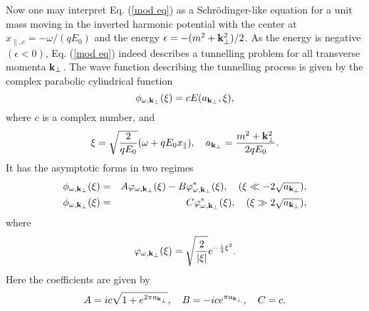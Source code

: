 \documentclass[a4paper,prd,showpacs,preprintnumbers,amsmath,amssymb]{revtex4}
\begin{document}
Now one may interpret Eq. (\ref{mod eq}) as a Schr\"{o}dinger-like
equation for a unit mass moving in the inverted harmonic potential
with the center at $x_{\parallel, c} = - \omega/(qE_0)$ and the
energy $\epsilon = - (m^2 + {\bf k}_{\perp}^2)/2$. As the energy
is negative $(\epsilon < 0)$, Eq. (\ref{mod eq}) indeed describes
a tunnelling problem for all transverse momenta ${\bf k}_{\perp}$.
The wave function describing the tunnelling process is given by
the complex parabolic cylindrical function \cite{abr}
\begin{equation}
\phi_{\omega, {\bf k}_{\perp}} (\xi) = c E(a_{{\bf k}_{\perp}},
\xi),
\end{equation}
where $c$ is a complex number, and
\begin{equation}
\xi = \sqrt{\frac{2}{q E_0}} ( \omega + q E_0 x_{\parallel}),
\quad a_{{\bf k}_{\perp}} = \frac{m^2 + {\bf k}_{\perp}^2}{2 q
E_0}.
\end{equation}
It has the asymptotic forms in two regimes
\begin{eqnarray}
\phi_{\omega, {\bf k}_{\perp}} (\xi) &=& A \varphi_{\omega, {\bf
k}_{\perp}} (\xi) - B \varphi^*_{\omega, {\bf k}_{\perp}} (\xi),
\quad (\xi  \ll -2 \sqrt{a_{{\bf k}_{\perp}}}),
 \nonumber\\
\phi_{\omega, {\bf k}_{\perp}} (\xi) &=& C \varphi^*_{\omega, {\bf
k}_{\perp}} (\xi), \quad (\xi  \gg 2 \sqrt{a_{{\bf k}_{\perp}}}),
\label{asym}
\end{eqnarray}
where
\begin{equation}
\varphi_{\omega, {\bf k}_{\perp}} (\xi) = \sqrt{\frac{2}{|\xi|}}
e^{- \frac{i}{4} \xi^2 }.
\end{equation}
Here the coefficients are given by
\begin{equation}
A = i c \sqrt{1 + e^{2 \pi a_{{\bf k}_{\perp}}}}, \quad B = - i c
e^{\pi a_{{\bf k}_{\perp}}}, \quad C= c.
\end{equation}
\end{document}

